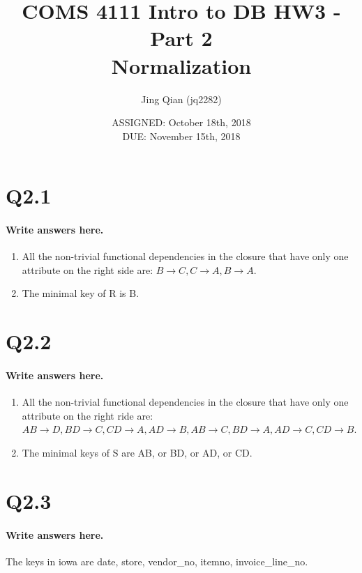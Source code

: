 \documentclass{article}
\title{COMS 4111 Intro to DB HW3 - Part 2 \\
Normalization}
\author{Jing Qian (jq2282)}
\date{ASSIGNED: October 18th, 2018 \\
DUE: November 15th, 2018}
\begin{document}
\maketitle



\pagebreak

\section*{Q2.1}
\paragraph{Write answers here.}
\begin{enumerate}[label=\alph*]
    \item All the non-trivial functional dependencies in the closure that have only one attribute on the right side are: $B \rightarrow C, C \rightarrow A, B \rightarrow A$.
    \item The minimal key of R is B.
\end{enumerate}

\newpage

\section*{Q2.2}
\paragraph{Write answers here.}
\begin{enumerate}[label=\alph*]
    \item All the non-trivial functional dependencies in the closure that have only one attribute on the right ride are: $AB \rightarrow D, BD \rightarrow C, CD \rightarrow A, AD \rightarrow B, AB \rightarrow C, BD \rightarrow A, AD \rightarrow C, CD \rightarrow B$.
    \item The minimal keys of S are AB, or BD, or AD, or CD.
\end{enumerate}

\newpage

\section*{Q2.3}
\paragraph{Write answers here.}
The keys in iowa are date, store, vendor\_no, itemno, invoice\_line\_no.
\end{document}
